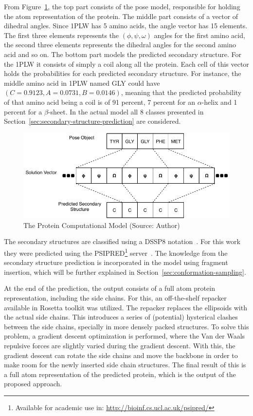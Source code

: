 From Figure~\ref{fig:protein-model}, the top part consists of the pose model,
responsible for holding the atom representation of the protein. The middle part
consists of a vector of dihedral angles. Since 1PLW has 5 amino acids, the
angle vector has 15 elements.  The first three elements represents the $(\phi,
\psi, \omega)$ angles for the first amino acid, the second three elements
represents the dihedral angles for the second amino acid and so on. The bottom
part models the predicted secondary structure. For the 1PLW it consists of
simply a coil along all the protein.  Each cell of this vector holds the
probabilities for each predicted secondary structure.  For instance, the middle
amino acid in 1PLW named GLY could have $(C=0.9123, A=0.0731, B=0.0146)$,
meaning that the predicted probability of that amino acid being a coil is of 91
percent, 7 percent for an $\alpha$-helix and 1 percent for a $\beta$-sheet. In
the actual model all 8 classes presented in
Section~\ref{sec:secondary-structure-prediction} are considered.

\begin{figure}
    \centering
    \includegraphics{Figuras/protein-representation.pdf}
    \vspace{1mm}
    \caption{The Protein Computational Model (Source: Author)}
    \label{fig:protein-model}
\end{figure}

The secondary structures are classified using a DSSP8
notation~\cite{frishman1995knowledge}.  For this work they were predicted using
the PSIPRED\footnote{Available for academic use in:
\url{http://bioinf.cs.ucl.ac.uk/psipred/}}  server~\cite{mcguffin2000psipred}. The knowledge from the secondary
structure prediction is incorporated in the model using fragment insertion,
which will be further explained in Section~\ref{sec:conformation-sampling}.

At the end of the prediction, the output consists of a full atom protein
representation, including the side chains. For this, an off-the-shelf repacker
available in Rosetta toolkit was utilized.  The repacker replaces the
ellipsoids with the actual side chains. This introduces a series of (potential)
hysterical clashes between the side chains, specially in more densely packed
structures. To solve this problem, a gradient descent optimization is
performed, where the Van der Waals repulsive forces are slightly varied during
the gradient descent.  With this, the gradient descent can rotate the side
chains and move the backbone in order to make room for the newly inserted side
chain structures.  The final result of this is a full atom representation of
the predicted protein, which is the output of the proposed approach.

